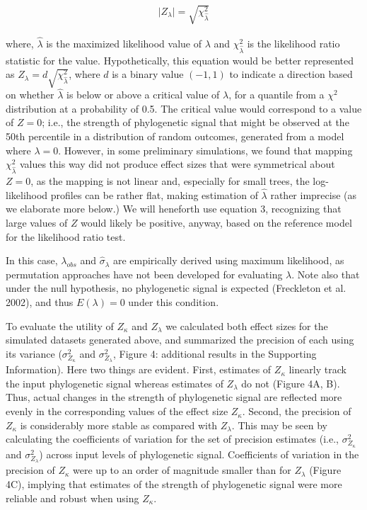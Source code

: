 \documentclass[]{article}
\begin{document}
\begin{align}
   \lvert Z_{\lambda} \rvert = \sqrt{\chi^2_{\hat{\lambda}}}
\end{align}

where, \(\hat{\lambda}\) is the maximized likelihood value of
\(\lambda\) and \(\chi^{2}_{\hat{\lambda}}\) is the likelihood ratio
statistic for the value. Hypothetically, this equation would be better
represented as \(Z_{\lambda} = d \sqrt{\chi^2_{\hat{\lambda}}}\), where
\(d\) is a binary value \((-1,1)\) to indicate a direction based on
whether \(\hat{\lambda}\) is below or above a critical value of
\(\lambda\), for a quantile from a \(\chi^{2}\) distribution at a
probability of 0.5. The critical value would correspond to a value of
\(Z = 0\); i.e., the strength of phylogenetic signal that might be
observed at the 50th percentile in a distribution of random outcomes,
generated from a model where \(\lambda = 0\). However, in some
preliminary simulations, we found that mapping
\(\chi^2_{\hat{\lambda}}\) values this way did not produce effect sizes
that were symmetrical about \(Z = 0\), as the mapping is not linear and,
especially for small trees, the log-likelihood profiles can be rather
flat, making estimation of \(\hat{\lambda}\) rather imprecise (as we
elaborate more below.) We will heneforth use equation 3, recognizing
that large values of \(Z\) would likely be positive, anyway, based on
the reference model for the likelihood ratio test.

In this case, \(\lambda_{obs}\) and \(\hat\sigma_\lambda\) are
empirically derived using maximum likelihood, as permutation approaches
have not been developed for evaluating \(\lambda\). Note also that under
the null hypothesis, no phylogenetic signal is expected (Freckleton et
al. 2002), and thus \(E(\lambda)=0\) under this condition. \hfill\break

To evaluate the utility of \(Z_\kappa\) and \(Z_\lambda\) we calculated
both effect sizes for the simulated datasets generated above, and
summarized the precision of each using its variance
(\(\sigma^2_{Z_\kappa}\) and \(\sigma^2_{Z_\lambda}\), Figure 4:
additional results in the Supporting Information). Here two things are
evident. First, estimates of \(Z_\kappa\) linearly track the input
phylogenetic signal whereas estimates of \(Z_\lambda\) do not (Figure
4A, B). Thus, actual changes in the strength of phylogenetic signal are
reflected more evenly in the corresponding values of the effect size
\(Z_\kappa\). Second, the precision of \(Z_\kappa\) is considerably more
stable as compared with \(Z_\lambda\). This may be seen by calculating
the coefficients of variation for the set of precision estimates (i.e.,
\(\sigma^2_{Z_\kappa}\) and \(\sigma^2_{Z_\lambda}\)) across input
levels of phylogenetic signal. Coefficients of variation in the
precision of \(Z_\kappa\) were up to an order of magnitude smaller than
for \(Z_\lambda\) (Figure 4C), implying that estimates of the strength
of phylogenetic signal were more reliable and robust when using
\(Z_\kappa\). \hfill\break
\end{document}
